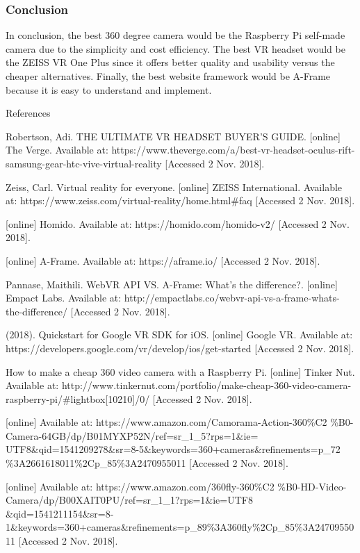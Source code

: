 \documentclass[onecolumn, draftclsnofoot,10pt, compsoc]{IEEEtran}
\begin{document}
\subsubsection{Conclusion}
    In conclusion, the best 360 degree camera would be the Raspberry Pi  self-made camera due to the simplicity and cost efficiency. 
    The best VR headset would be the ZEISS VR One Plus since it offers better quality and usability versus the cheaper alternatives. 
    Finally, the best website framework would be A-Frame because it is easy to understand and implement.
    \newpage
\begin{Meghan-techreview-bib}{References}

Robertson, Adi. THE ULTIMATE VR HEADSET BUYER’S GUIDE. [online] The Verge. Available at: https://www.theverge.com/a/best-vr-headset-oculus-rift-samsung-gear-htc-vive-virtual-reality [Accessed 2 Nov. 2018].

Zeiss,  Carl. Virtual reality for everyone. [online] ZEISS International. Available at: https://www.zeiss.com/virtual-reality/home.html\#faq [Accessed 2 Nov. 2018].

[online] Homido. Available at: https://homido.com/homido-v2/ [Accessed 2 Nov. 2018].

[online] A-Frame. Available at: https://aframe.io/ [Accessed 2 Nov. 2018].

Pannase, Maithili. WebVR API VS. A-Frame: What's the difference?. [online] Empact Labs. Available at: http://empactlabs.co/webvr-api-vs-a-frame-whats-the-difference/ [Accessed 2 Nov. 2018].

(2018). Quickstart for Google VR SDK for iOS. [online] Google VR. Available at: https://developers.google.com/vr/develop/ios/get-started [Accessed 2 Nov. 2018].

How to make a cheap 360 video camera with a Raspberry Pi. [online] Tinker Nut. Available at: http://www.tinkernut.com/portfolio/make-cheap-360-video-camera-raspberry-pi/\#lightbox[10210]/0/ [Accessed 2 Nov. 2018].

[online] Available at: https://www.amazon.com/Camorama-Action-360\%C2
\%B0-Camera-64GB/dp/B01MYXP52N/ref=sr\_1\_5?rps=1\&ie=
UTF8\&qid=1541209278\&sr=8-5\&keywords=360+cameras\&refinements=p\_72
\%3A2661618011\%2Cp\_85\%3A2470955011 [Accessed 2 Nov. 2018].

[online] Available at: https://www.amazon.com/360fly-360\%C2
\%B0-HD-Video-Camera/dp/B00XAIT0PU/ref=sr\_1\_1?rps=1\&ie=UTF8
\&qid=1541211154\&sr=8-1\&keywords=360+cameras\&refinements=p\_89\%3A360fly\%2Cp\_85\%3A2470955011 [Accessed 2 Nov. 2018].

\end{Meghan-techreview-bib}
\end{document}
